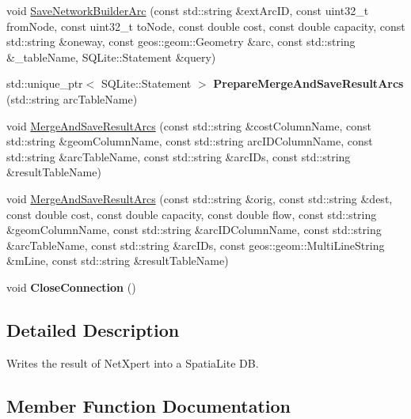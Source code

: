 \begin{DoxyCompactItemize}
\item 
void \hyperlink{classnetxpert_1_1io_1_1SpatiaLiteWriter_afad833dd75ce96d72718fe8cdac0ba11}{Save\+Network\+Builder\+Arc} (const std\+::string \&ext\+Arc\+ID, const uint32\+\_\+t from\+Node, const uint32\+\_\+t to\+Node, const double cost, const double capacity, const std\+::string \&oneway, const geos\+::geom\+::\+Geometry \&arc, const std\+::string \&\+\_\+table\+Name, S\+Q\+Lite\+::\+Statement \&query)
\item 
std\+::unique\+\_\+ptr$<$ S\+Q\+Lite\+::\+Statement $>$ {\bfseries Prepare\+Merge\+And\+Save\+Result\+Arcs} (std\+::string arc\+Table\+Name)\hypertarget{classnetxpert_1_1io_1_1SpatiaLiteWriter_a1736b92804e3fe4fd7ef15d32f559c47}{}\label{classnetxpert_1_1io_1_1SpatiaLiteWriter_a1736b92804e3fe4fd7ef15d32f559c47}

\item 
void \hyperlink{classnetxpert_1_1io_1_1SpatiaLiteWriter_adeb9fd254a0dbbb576047fbae8475044}{Merge\+And\+Save\+Result\+Arcs} (const std\+::string \&cost\+Column\+Name, const std\+::string \&geom\+Column\+Name, const std\+::string arc\+I\+D\+Column\+Name, const std\+::string \&arc\+Table\+Name, const std\+::string \&arc\+I\+Ds, const std\+::string \&result\+Table\+Name)
\item 
void \hyperlink{classnetxpert_1_1io_1_1SpatiaLiteWriter_a66c389507a4c5d979431c1a6e57e76f5}{Merge\+And\+Save\+Result\+Arcs} (const std\+::string \&orig, const std\+::string \&dest, const double cost, const double capacity, const double flow, const std\+::string \&geom\+Column\+Name, const std\+::string \&arc\+I\+D\+Column\+Name, const std\+::string \&arc\+Table\+Name, const std\+::string \&arc\+I\+Ds, const geos\+::geom\+::\+Multi\+Line\+String \&m\+Line, const std\+::string \&result\+Table\+Name)
\item 
void {\bfseries Close\+Connection} ()\hypertarget{classnetxpert_1_1io_1_1SpatiaLiteWriter_a0785a12e98c75749df06d3b33b98afb9}{}\label{classnetxpert_1_1io_1_1SpatiaLiteWriter_a0785a12e98c75749df06d3b33b98afb9}

\end{DoxyCompactItemize}


\subsection{Detailed Description}
Writes the result of Net\+Xpert into a Spatia\+Lite DB. 

\subsection{Member Function Documentation}
